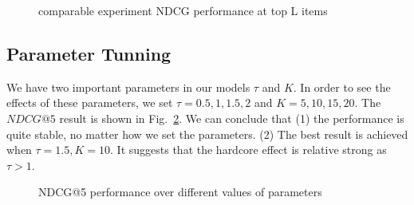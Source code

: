 \documentclass{sig-alternate}
\begin{document}
\begin{figure}[!htbp]
\centering
{}
\label{fig:compNDCG}
\caption{comparable experiment NDCG performance at top L items}
\end{figure}


\subsection{Parameter Tunning}
We have two important parameters in our models $\tau$ and $K$. In order to see the effects of these parameters, we set $\tau=0.5,1,1.5,2$ and $K=5,10,15,20$. The $NDCG@5$ result is shown in Fig.~\ref{fig:parameter}. We can conclude that (1) the performance is quite stable, no matter how we set the parameters. (2) The best result is achieved when $\tau=1.5,K=10$. It suggests that the hardcore effect is relative strong as $\tau>1$.
\begin{figure}[htbp]
\centering
{}
\caption{NDCG@5 performance over different values of parameters}\label{fig:parameter}
\end{figure}
\end{document}

